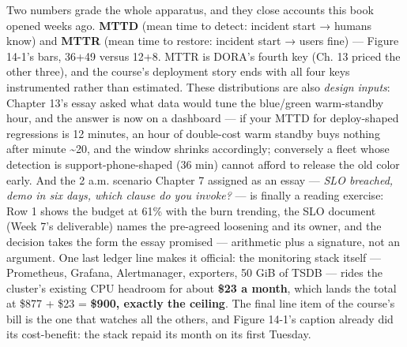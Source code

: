 Two numbers grade the whole apparatus, and they close accounts this book opened weeks ago. \textbf{MTTD} (mean time to detect: incident start → humans know) and \textbf{MTTR} (mean time to restore: incident start → users fine) — Figure 14-1’s bars, 36+49 versus 12+8. MTTR is DORA’s fourth key (Ch. 13 priced the other three), and the course’s deployment story ends with all four keys instrumented rather than estimated. These distributions are also \textit{design inputs}: Chapter 13’s essay asked what data would tune the blue/green warm-standby hour, and the answer is now on a dashboard — if your MTTD for deploy-shaped regressions is 12 minutes, an hour of double-cost warm standby buys nothing after minute \textasciitilde{}20, and the window shrinks accordingly; conversely a fleet whose detection is support-phone-shaped (36 min) cannot afford to release the old color early. And the 2 a.m. scenario Chapter 7 assigned as an essay — \textit{SLO breached, demo in six days, which clause do you invoke?} — is finally a reading exercise: Row 1 shows the budget at 61\% with the burn trending, the SLO document (Week 7’s deliverable) names the pre-agreed loosening and its owner, and the decision takes the form the essay promised — arithmetic plus a signature, not an argument. One last ledger line makes it official: the monitoring stack itself — Prometheus, Grafana, Alertmanager, exporters, 50 GiB of TSDB — rides the cluster’s existing CPU headroom for about \textbf{\$23 a month}, which lands the total at \$877 + \$23 = \textbf{\$900, exactly the ceiling}. The final line item of the course’s bill is the one that watches all the others, and Figure 14-1’s caption already did its cost-benefit: the stack repaid its month on its first Tuesday.

